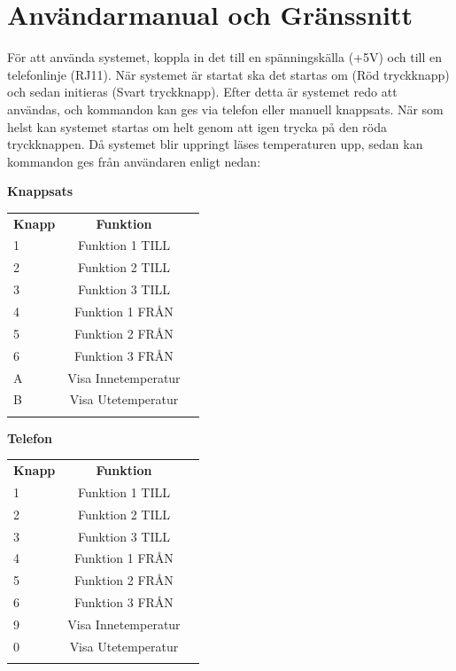 \documentclass[a4paper,11pt]{article}
\begin{document}
	\appendix
	\renewcommand{\appendixpagename}{Appendix}
	\appendixpage
	\renewcommand{\appendixtocname}{Appendix}

	\addappheadtotoc

	\section{Användarmanual och Gränssnitt}
	\label{sec:Manual}
	För att använda systemet, koppla in det till en spänningskälla (+5V) och till en telefonlinje (RJ11).
	När systemet är startat ska det startas om (Röd tryckknapp) och sedan initieras (Svart tryckknapp).
	Efter detta är systemet redo att användas, och kommandon kan ges via telefon eller manuell knappsats.
	När som helst kan systemet startas om helt genom att igen trycka på den röda tryckknappen.
	Då systemet blir uppringt läses temperaturen upp, sedan kan kommandon ges från användaren enligt nedan:\\

	\begin{table}[ht]
		\begin{minipage}[b]{0.5\linewidth}\centering
			{\bf Knappsats}\\
			\begin{tabular}{l c r}
				\\{\bf Knapp} & {\bf Funktion}\\
				1 & Funktion 1 TILL\\		
				2 & Funktion 2 TILL\\		
				3 & Funktion 3 TILL\\
				4 & Funktion 1 FRÅN\\	
				5 & Funktion 2 FRÅN\\
				6 & Funktion 3 FRÅN\\		
				A & Visa Innetemperatur\\
				B & Visa Utetemperatur \\\\
			\end{tabular}
	 	\end{minipage}
	 	\hspace{0.5cm}
	 	\begin{minipage}[b]{0.5\linewidth}
			\centering
			{\bf Telefon}\\
			\begin{tabular}{l c r}
				\\{\bf Knapp} & {\bf Funktion}\\
				1 & Funktion 1 TILL\\		
				2 & Funktion 2 TILL\\		
				3 & Funktion 3 TILL\\
				4 & Funktion 1 FRÅN\\	
				5 & Funktion 2 FRÅN\\
				6 & Funktion 3 FRÅN\\
				9 & Visa Innetemperatur\\
				0 & Visa Utetemperatur \\\\
			\end{tabular}
	 	\end{minipage}
	\end{table}
\end{document}
